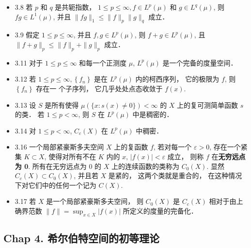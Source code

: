 \begin{itemize}
\item 3.8 若 $p$ 和 $q$ 是共轭指数， $1 \leqslant p \leqslant \infty, f \in L^{p}(\mu)$ 和 $g \in L^{q}(\mu)$, 则 $f g \in L^{1}(\mu)$, 并且 $\|f g\|_{1} \leqslant\|f\|_{p}\|g\|_{q}$ 成立．

\item 3.9 假定 $1 \leqslant p \leqslant \infty$, 并且 $f, g \in L^{p}(\mu)$, 则 $f+g \in L^{p}(\mu)$, 且 $\|f+g\|_{p} \leqslant\|f\|_{p}+\|g\|_{p}$ 成立．

\item 3.11 对于 $1 \leqslant p \leqslant \infty$ 和每一个正测度 $\mu$, $L^{p}(\mu)$ 是一个完备的度量空间．

\item 3.12 若 $1 \leqslant p \leqslant \infty,\left\{f_{n}\right\}$ 是在 $L^{p}(\mu)$ 内的柯西序列， 它的极限为 $f$, 则 $\left\{f_{n}\right\}$ 存在一 个子序列， 它几乎处处点态收敛于 $f(x)$.

\item 3.13 设 $S$ 是所有使得 $\mu(\{x: s(x) \neq 0\})<\infty$ 的 $X$ 上的复可测简单函数 $s$ 的类． 若 $1 \leqslant p<\infty$, 则 $S$ 在 $L^{p}(\mu)$ 中是稠密的．

\item 3.14 对 $1 \leqslant p<\infty$, $C_{c}(X)$ 在 $L^{p}(\mu)$ 中稠密．

\item 3.16 一个局部紧豪斯多夫空间 $X$ 上的复函数 $f$, 若对每一个 $\varepsilon>0$, 存在一个紧集 $K \subset X$, 使得对所有不在 $K$ 内的 $x$, $|f(x)|<\varepsilon$ 成立， 则称 $f$ 在\textbf{无穷远点为 0}. 所有在无穷远点为 0 的 $X$ 上的连续函数的类称为 $C_{0}(X)$. 显然 $C_{c}(X) \subset C_{0}(X)$, 并且若 $X$ 是紧的， 这两个类就是重合的， 在这种情况下对它们中的任何一个记为 $C(X)$.

\item 3.17 若 $X$ 是一个局部紧豪斯多夫空间， 则 $C_{0}(X)$ 是 $C_{c}(X)$ 相对于由上确界范数 $\|f\|=\sup _{x \in X}|f(x)|$ 所定义的度量的完备化．
\end{itemize}

\subsection{Chap 4. 希尔伯特空间的初等理论}

